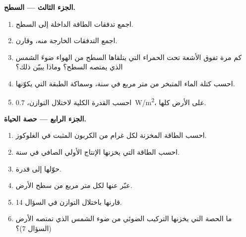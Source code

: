 \begin{problem}
\medskip
\noindent\textbf{الجزء الثالث --- السطح.}
\begin{enumerate}[resume]
  \item اجمع تدفقات الطاقة الداخلة إلى السطح.
  \item اجمع التدفقات الخارجة منه، وقارن.
  \item كم مرة تفوق الأشعة تحت الحمراء التي يتلقاها السطح من الهواء ضوءَ الشمس
        الذي يمتصه السطح؟ وماذا يبيّن ذلك؟
  \item احسب كتلة الماء المتبخر من متر مربع في سنة، وسماكة الطبقة
        التي يكوّنها.
  \item احسب القدرة الكلية لاختلال التوازن، \qty{0.7}{W/m^2}، على
        الأرض كلها.
\end{enumerate}

\medskip
\noindent\textbf{الجزء الرابع --- حصة الحياة.}
\begin{enumerate}[resume]
  \item احسب الطاقة المخزنة لكل غرام من الكربون المثبت في الغلوكوز.
  \item احسب الطاقة التي يخزنها الإنتاج الأولي الصافي في سنة.
  \item حوّلها إلى قدرة.
  \item عبّر عنها لكل متر مربع من سطح الأرض.
  \item قارنها باختلال التوازن في السؤال 14.
  \item ما الحصة التي يخزنها التركيب الضوئي من ضوء الشمس الذي تمتصه الأرض
        (السؤال 7)؟
\end{enumerate}
\end{problem}
